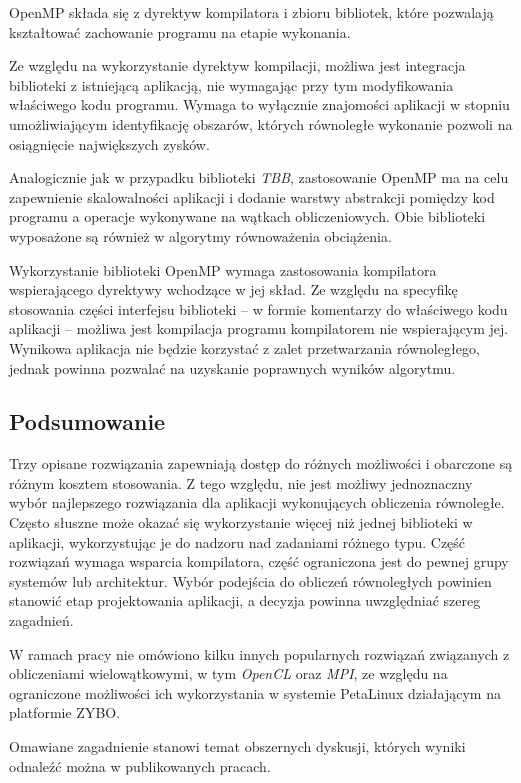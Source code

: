 OpenMP składa się z dyrektyw kompilatora i zbioru bibliotek, które pozwalają kształtować zachowanie programu na etapie wykonania.

Ze względu na wykorzystanie dyrektyw kompilacji, możliwa jest integracja biblioteki z istniejącą aplikacją, nie wymagając przy tym modyfikowania właściwego kodu programu. Wymaga to wyłącznie znajomości aplikacji w stopniu umożliwiającym identyfikację obszarów, których równoległe wykonanie pozwoli na osiągnięcie największych zysków.

Analogicznie jak w przypadku biblioteki \emph{TBB}, zastosowanie OpenMP ma na celu zapewnienie skalowalności aplikacji i dodanie warstwy abstrakcji pomiędzy kod programu a operacje wykonywane na wątkach obliczeniowych. Obie biblioteki wyposażone są również w algorytmy równoważenia obciążenia.

Wykorzystanie biblioteki OpenMP wymaga zastosowania kompilatora wspierającego dyrektywy wchodzące w jej skład. Ze względu na specyfikę stosowania części interfejsu biblioteki -- w formie komentarzy do właściwego kodu aplikacji -- możliwa jest kompilacja programu kompilatorem nie wspierającym jej. Wynikowa aplikacja nie będzie korzystać z zalet przetwarzania równoległego, jednak powinna pozwalać na uzyskanie poprawnych wyników algorytmu.

\subsection*{Podsumowanie}
Trzy opisane rozwiązania zapewniają dostęp do różnych możliwości i obarczone są różnym kosztem stosowania. Z tego względu, nie jest możliwy jednoznaczny wybór najlepszego rozwiązania dla aplikacji wykonujących obliczenia równoległe. Często słuszne może okazać się wykorzystanie więcej niż jednej biblioteki w aplikacji, wykorzystując je do nadzoru nad zadaniami różnego typu. 
Część rozwiązań wymaga wsparcia kompilatora, część ograniczona jest do pewnej grupy systemów lub architektur. Wybór podejścia do obliczeń równoległych powinien stanowić etap projektowania aplikacji, a decyzja powinna uwzględniać szereg zagadnień.

W ramach pracy nie omówiono kilku innych popularnych rozwiązań związanych z obliczeniami wielowątkowymi, w tym \emph{OpenCL} oraz \emph{MPI}, ze względu na ograniczone możliwości ich wykorzystania w systemie PetaLinux działającym na platformie ZYBO.

Omawiane zagadnienie stanowi temat obszernych dyskusji, których wyniki odnaleźć można w publikowanych pracach. \cite{choosing-thread-framework,Kegel2009}


